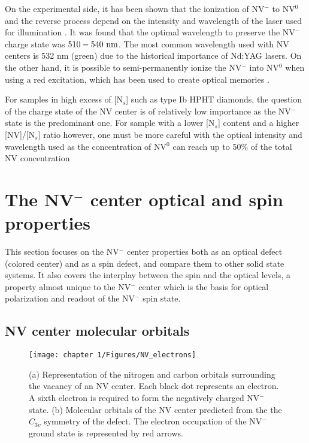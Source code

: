 \documentclass[a4paper, 11pt]{book}
\begin{document}
On the experimental side, it has been shown that the ionization of NV$^-$ to NV$^0$ and the reverse process depend on the intensity and wavelength of the laser used for illumination \citep{aslam2013photo}. It was found that the optimal wavelength to preserve the NV$^-$ charge state was  $510-540\ \rm nm$. The most common wavelength used with NV centers is 532 nm (green) due to the historical importance of Nd:YAG lasers. On the other hand, it is possible to semi-permanently ionize the NV$^-$ into NV$^0$ when using a red excitation, which has been used to create optical memories \citep{dhomkar2016long}.

For samples in high excess of [N$_s$] such as type Ib HPHT diamonds, the question of the charge state of the NV center is of relatively low importance as the NV$^-$ state is the predominant one. For sample with a lower [N$_s$] content and a higher [NV]/[N$_s$] ratio however, one must be more careful with the optical intensity and wavelength used as the concentration of NV$^0$ can reach up to 50\% of the total NV concentration \citep{grezes2015storage}

\section{The NV$^-$ center optical and spin properties}

This section focuses on the NV$^-$ center properties both as an optical defect (colored center) and as a spin defect, and compare them to other solid state systems. It also covers the interplay between the spin and the optical levels, a property almost unique to the NV$^-$ center which is the basis for optical polarization and readout of the NV$^-$ spin state.

\subsection{NV center molecular orbitals}

\begin{figure}[h!]
\centering
\texttt{[image: chapter 1/Figures/NV\_electrons]}
\caption{(a) Representation of the nitrogen and carbon orbitals surrounding the vacancy of an NV center. Each black dot represents an electron. A sixth electron is required to form the negatively charged NV$^-$ state. (b) Molecular orbitals of the NV center predicted from the the $C_{3v}$ symmetry of the defect. The electron occupation of the NV$^-$ ground state is represented by red arrows.}
\label{NV electrons}
\end{figure}
\end{document}

